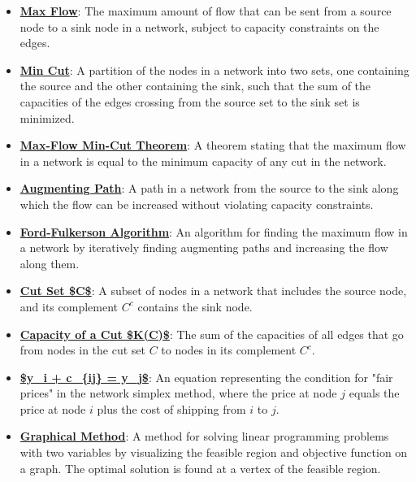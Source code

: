 \documentclass{article}%
\begin{document}
\begin{itemize}[leftmargin=*]%
\item \href{https://www.math.purdue.edu/~yipn/421/2024-11-19-MaxFlowMinCut.pdf#page=1}{\textbf{Max Flow}}: The maximum amount of flow that can be sent from a source node to a sink node in a network, subject to capacity constraints on the edges.%
\item \href{https://www.math.purdue.edu/~yipn/421/2024-11-19-MaxFlowMinCut.pdf#page=2}{\textbf{Min Cut}}: A partition of the nodes in a network into two sets, one containing the source and the other containing the sink, such that the sum of the capacities of the edges crossing from the source set to the sink set is minimized.%
\item \href{https://www.math.purdue.edu/~yipn/421/2024-11-19-MaxFlowMinCut.pdf#page=4}{\textbf{Max{-}Flow Min{-}Cut Theorem}}: A theorem stating that the maximum flow in a network is equal to the minimum capacity of any cut in the network.%
\item \href{https://www.math.purdue.edu/~yipn/421/2024-11-19-MaxFlowMinCut.pdf#page=10}{\textbf{Augmenting Path}}: A path in a network from the source to the sink along which the flow can be increased without violating capacity constraints.%
\item \href{https://www.math.purdue.edu/~yipn/421/2024-11-19-MaxFlowMinCut.pdf#page=10}{\textbf{Ford{-}Fulkerson Algorithm}}: An algorithm for finding the maximum flow in a network by iteratively finding augmenting paths and increasing the flow along them.%
\item \href{https://www.math.purdue.edu/~yipn/421/2024-11-19-MaxFlowMinCut.pdf#page=2}{\textbf{Cut Set \$C\$}}: A subset of nodes in a network that includes the source node, and its complement $C^c$ contains the sink node.%
\item \href{https://www.math.purdue.edu/~yipn/421/2024-11-19-MaxFlowMinCut.pdf#page=2}{\textbf{Capacity of a Cut \$K(C)\$}}: The sum of the capacities of all edges that go from nodes in the cut set $C$ to nodes in its complement $C^c$.%
\end{itemize}%
\begin{itemize}[leftmargin=*]%
\item \href{https://www.math.purdue.edu/~yipn/421/2024-11-21-EconNetSimplex.pdf#page=4}{\textbf{\$y\_i + c\_\{ij\} = y\_j\$}}: An equation representing the condition for "fair prices" in the network simplex method, where the price at node $j$ equals the price at node $i$ plus the cost of shipping from $i$ to $j$.%
\end{itemize}%
\begin{itemize}[leftmargin=*]%
\item \href{https://www.math.purdue.edu/~yipn/421/2024-12-03-Duality.pdf#page=3}{\textbf{Graphical Method}}: A method for solving linear programming problems with two variables by visualizing the feasible region and objective function on a graph. The optimal solution is found at a vertex of the feasible region.%
\end{itemize}
\end{document}
